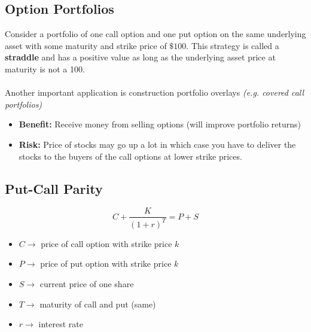 \documentclass[11pt]{article}
\begin{document}
\subsection{Option Portfolios}
Consider a portfolio of one call option and one put option on the same underlying asset with some maturity and strike price of $\$100 $. This strategy is called a \textbf{straddle} and has a positive value as long as the underlying asset price at maturity is not a 100. \\ \\ Another important application is construction portfolio overlays \textit{(e.g. covered call portfolios)}
\begin{itemize}
\item \textbf{Benefit:} Receive money from selling options (will improve portfolio returns)
\item\textbf{Risk:} Price of stocks may go up a lot in which case you have to deliver the stocks to the buyers of the call options at lower strike prices.
\end{itemize}

\subsection{Put-Call Parity}
$$ C + \frac{K}{(1+r)^T} = P +S $$ 
\begin{itemize}
\item $ C \rightarrow$ price of call option with strike price $k$
\item $ P \rightarrow$ price of put option with strike price $k$
\item $ S \rightarrow$ current price of one share
\item $ T \rightarrow$ maturity of call and put (same)
\item $ r \rightarrow$ interest rate
\end{itemize}

\pagebreak
\end{document}
